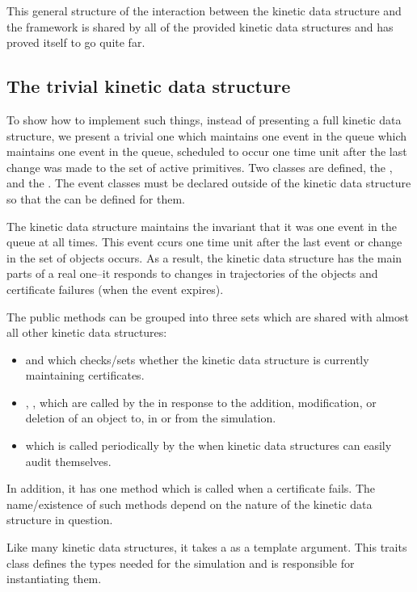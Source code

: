This general structure of the interaction between the kinetic data
structure and the framework is shared by all of the provided kinetic
data structures and has proved itself to go quite far.

\subsection{The trivial kinetic data structure}

To show how to implement such things, instead of presenting a full
kinetic data structure, we present a trivial one which maintains one
event in the queue which maintains one event in the queue, scheduled
to occur one time unit after the last change was made to the set of
active primitives.  Two classes are defined, the ,
and the . The event classes must be declared outside
of the kinetic data structure so that the  can be
defined for them.

The kinetic data structure maintains the invariant that it was one
event in the queue at all times. This event ccurs one time unit after
the last event or change in the set of objects occurs. As a result,
the kinetic data structure has the main parts of a real one--it
responds to changes in trajectories of the objects and certificate
failures (when the event expires).

 The public methods can be grouped into three sets which are shared
 with almost all other kinetic data structures:
\begin{itemize}
\item {} and  which
  checks/sets whether the kinetic data structure is currently
  maintaining certificates.
\item {}, ,  which are called by the
   in response to the
  addition, modification, or deletion of an object to, in or from the
  simulation.
\item {} which is called periodically by the
   when kinetic data structures can
  easily audit themselves.
\end{itemize} 

In addition, it has one method which is called when a certificate
fails. The name/existence of such methods depend on the nature of the
kinetic data structure in question.

Like many kinetic data structures, it takes a 
as a template argument. This traits class defines the types needed for
the simulation and is responsible for instantiating them.

